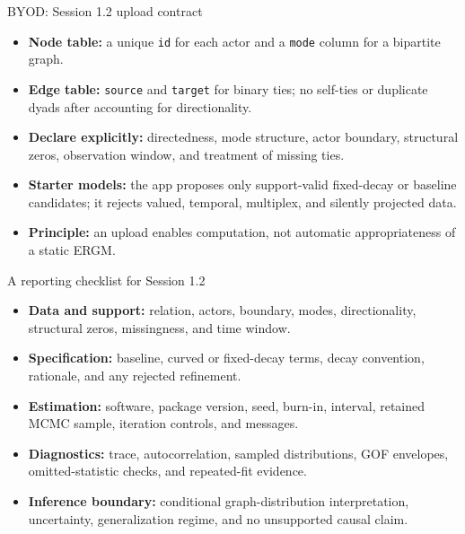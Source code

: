 \documentclass[aspectratio=169,11pt]{beamer}
\newcommand{\term}[1]{\textbf{\color{nupurple}#1}}
\begin{document}
\begin{frame}{BYOD: Session 1.2 upload contract}
\begin{itemize}
\item \term{Node table:} a unique \texttt{id} for each actor and a \texttt{mode} column for a bipartite graph.
\item \term{Edge table:} \texttt{source} and \texttt{target} for binary ties; no self-ties or duplicate dyads after accounting for directionality.
\item \term{Declare explicitly:} directedness, mode structure, actor boundary, structural zeros, observation window, and treatment of missing ties.
\item \term{Starter models:} the app proposes only support-valid fixed-decay or baseline candidates; it rejects valued, temporal, multiplex, and silently projected data.
\item \term{Principle:} an upload enables computation, not automatic appropriateness of a static ERGM.
\end{itemize}
\end{frame}

\begin{frame}{A reporting checklist for Session 1.2}
\begin{itemize}
\item \term{Data and support:} relation, actors, boundary, modes, directionality, structural zeros, missingness, and time window.
\item \term{Specification:} baseline, curved or fixed-decay terms, decay convention, rationale, and any rejected refinement.
\item \term{Estimation:} software, package version, seed, burn-in, interval, retained MCMC sample, iteration controls, and messages.
\item \term{Diagnostics:} trace, autocorrelation, sampled distributions, GOF envelopes, omitted-statistic checks, and repeated-fit evidence.
\item \term{Inference boundary:} conditional graph-distribution interpretation, uncertainty, generalization regime, and no unsupported causal claim.
\end{itemize}
\end{frame}
\end{document}

